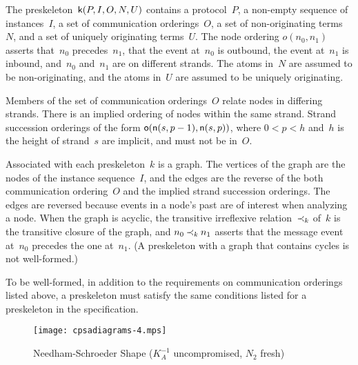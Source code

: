 \documentclass[12pt]{report}
\theoremstyle{definition}
\begin{document}
The preskeleton~$\operatorname{\mathsf{k}}(P,I,O,N,U)$ contains a
protocol~$P$, a non-empty sequence of instances~$I$, a set of
communication orderings~$O$, a set of non-originating
terms~$N$, and a set of uniquely
originating terms~$U$.  The node
ordering $o(n_0, n_1)$
asserts that~$n_0$ precedes~$n_1$, that the event at~$n_0$ is
outbound, the event at~$n_1$ is inbound, and~$n_0$ and~$n_1$
are on different strands.  The atoms in~$N$ are assumed to be
non-originating, and the atoms in~$U$ are assumed to be uniquely
originating.

Members of the set of communication orderings~$O$ relate nodes in
differing strands.  There is an implied ordering of nodes within the
same strand.  Strand succession orderings of the form
$\operatorname{\mathsf{o}}(\operatorname{\mathsf{n}}(s, p-1), \operatorname{\mathsf{n}}(s, p))$, where $0 < p < h$ and~$h$ is
the height of strand~$s$ are implicit, and must not be in~$O$.

Associated with each preskeleton~$k$ is a graph.  The vertices of the
graph are the nodes of the instance sequence~$I$, and the edges are
the reverse of the both communication ordering~$O$ and the implied
strand succession orderings.  The edges are reversed because events in
a node's past are of interest when analyzing a node.  When the graph
is acyclic, the transitive irreflexive relation~$\mathbin{\prec_{k}}$ of~$k$ is the
transitive closure of the graph, and $n_0\mathbin{\prec_{k}} n_1$ asserts that the
message event at~$n_0$ precedes the one at~$n_1$.  (A preskeleton with
a graph that contains cycles is not well-formed.)

To be well-formed, in addition to the
requirements on communication orderings listed above, a preskeleton
must satisfy the same conditions listed for a preskeleton in the
specification.

\begin{figure}
\begin{center}
\texttt{[image: cpsadiagrams-4.mps]}
\caption{Needham-Schroeder Shape ($K^{-1}_A$ uncompromised, $N_2$ fresh)}
\label{fig:ns shape}
\end{center}
\end{figure}
\end{document}
